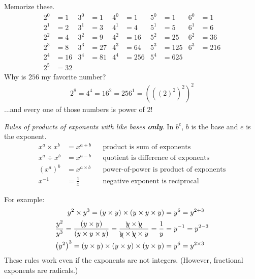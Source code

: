 \documentclass[11pt]{article}%
\begin{document}
\begin{multicols*}{2}
\divider

Memorize these.
\begin{align*}
2^{0} &= 1 & 3^{0} &= 1 & 4^{0} &= 1 & 5^{0} &= 1 & 6^{0} &= 1 \\
2^{1} &= 2 & 3^{1} &= 3 & 4^{1} &= 4 & 5^{1} &= 5 & 6^{1} &= 6 \\
2^{2} &= 4 & 3^{2} &= 9 & 4^{2} &= 16 & 5^{2} &= 25 & 6^{2} &= 36 \\
2^{3} &= 8 & 3^{3} &= 27 & 4^{3} &= 64 & 5^{3} &= 125 & 6^{3} &= 216 \\
2^{4} &= 16 & 3^{4} &= 81 & 4^{4} &= 256 & 5^{4} &= 625 \\
2^{5} &= 32
\end{align*}
Why is $256$ my favorite number?
\begin{align*}
2^{8} = 4^{4} = 16^{2} = 256^{1} = \left(\left(\left( 2 \right)^{2}\right)^{2}\right)^{2}
\end{align*}
...and every one of those numbers is power of 2!

\divider

\textit{Rules of products of exponents with like bases \textbf{only}}. In $b^{e}$, $b$ is the base and $e$ is the exponent.
\begin{align*}
x^{a} \times x^{b} &= x^{a + b} && \text{product is sum of exponents} \\
x^{a} \div x^{b} &= x^{a - b} && \text{quotient is difference of exponents} \\
\left( x^{a}\right)^{b} &= x^{a \times b} && \text{power-of-power is product of exponents} \\
x^{-1} &= \frac{1}{x} && \text{negative exponent is reciprocal}
\end{align*}

For example:
\begin{align*}
y^{2} \times y^{3} = \left( y \times y \right) \times \left( y \times y \times y \right) &= y^{6} = y^{2 + 3} \\
\frac{y^{2}}{y^{3}} = \frac{\left( y \times y \right)}{\left( y \times y \times y \right)} = \frac{\bcancel{y} \times \bcancel{y}}{\bcancel{y} \times \bcancel{y} \times y} = \frac{1}{y} &= y^{-1} = y^{2 - 3} \\
\left( y^{2} \right)^{3} = \left( y \times y \right) \times \left( y \times y \right) \times \left( y \times y \right) &= y^{6} = y^{2 \times 3}
\end{align*}
These rules work even if the exponents are not integers. (However, fractional exponents are radicals.)

\divider


\divider



\divider

\end{multicols*}
\end{document}
